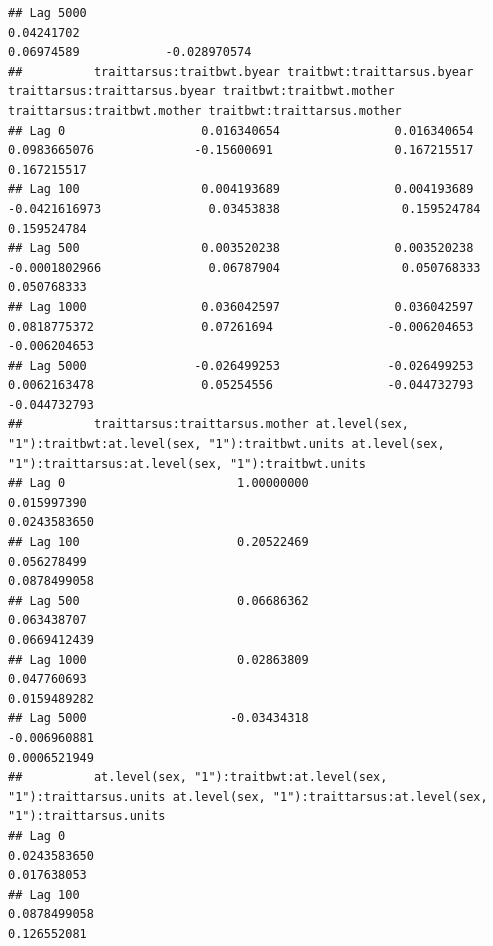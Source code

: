 \documentclass[
  12pt,
]{book}
\begin{document}
\begin{verbatim}
## Lag 5000                                                        0.04241702                                                           0.06974589            -0.028970574
##          traittarsus:traitbwt.byear traitbwt:traittarsus.byear traittarsus:traittarsus.byear traitbwt:traitbwt.mother traittarsus:traitbwt.mother traitbwt:traittarsus.mother
## Lag 0                   0.016340654                0.016340654                  0.0983665076              -0.15600691                 0.167215517                 0.167215517
## Lag 100                 0.004193689                0.004193689                 -0.0421616973               0.03453838                 0.159524784                 0.159524784
## Lag 500                 0.003520238                0.003520238                 -0.0001802966               0.06787904                 0.050768333                 0.050768333
## Lag 1000                0.036042597                0.036042597                  0.0818775372               0.07261694                -0.006204653                -0.006204653
## Lag 5000               -0.026499253               -0.026499253                  0.0062163478               0.05254556                -0.044732793                -0.044732793
##          traittarsus:traittarsus.mother at.level(sex, "1"):traitbwt:at.level(sex, "1"):traitbwt.units at.level(sex, "1"):traittarsus:at.level(sex, "1"):traitbwt.units
## Lag 0                        1.00000000                                                   0.015997390                                                     0.0243583650
## Lag 100                      0.20522469                                                   0.056278499                                                     0.0878499058
## Lag 500                      0.06686362                                                   0.063438707                                                     0.0669412439
## Lag 1000                     0.02863809                                                   0.047760693                                                     0.0159489282
## Lag 5000                    -0.03434318                                                  -0.006960881                                                     0.0006521949
##          at.level(sex, "1"):traitbwt:at.level(sex, "1"):traittarsus.units at.level(sex, "1"):traittarsus:at.level(sex, "1"):traittarsus.units
## Lag 0                                                        0.0243583650                                                         0.017638053
## Lag 100                                                      0.0878499058                                                         0.126552081

\end{verbatim}
\end{document}
